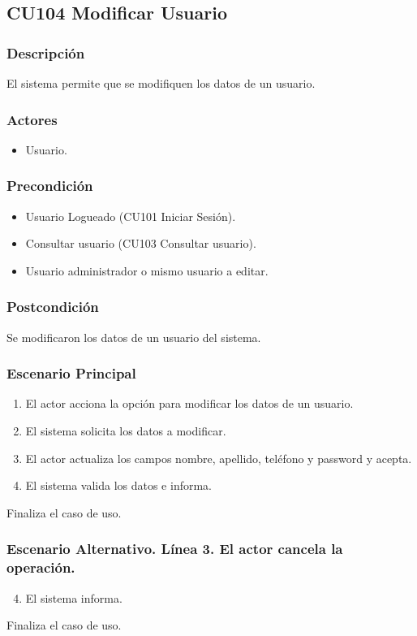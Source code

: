 \subsection{CU104 Modificar Usuario}
\subsubsection{Descripci\'{o}n}
El sistema permite que se modifiquen los datos de un usuario.
\subsubsection{Actores}
\begin{itemize}
\item Usuario.
\end{itemize}
\subsubsection{Precondici\'{o}n}
\begin{itemize}
\item Usuario Logueado (CU101 Iniciar Sesi\'{o}n).
\item Consultar usuario (CU103 Consultar usuario).
\item Usuario administrador o mismo usuario a editar.
\end{itemize}
\subsubsection{Postcondici\'{o}n}
Se modificaron los datos de un usuario del sistema.
\subsubsection{Escenario Principal}
\begin{enumerate}
\item El actor acciona la opci\'{o}n para modificar los datos de un usuario.
\item El sistema solicita los datos a modificar.
\item El actor actualiza los campos nombre, apellido, tel\'{e}fono y password y acepta.
\item El sistema valida los datos e informa.
\end{enumerate}
Finaliza el caso de uso.
\subsubsection{Escenario Alternativo. L\'{i}nea 3. El actor cancela la operaci\'{o}n.}
\begin{enumerate}
\setcounter{enumi}{3}
\item El sistema informa.
\end{enumerate}
Finaliza el caso de uso.
